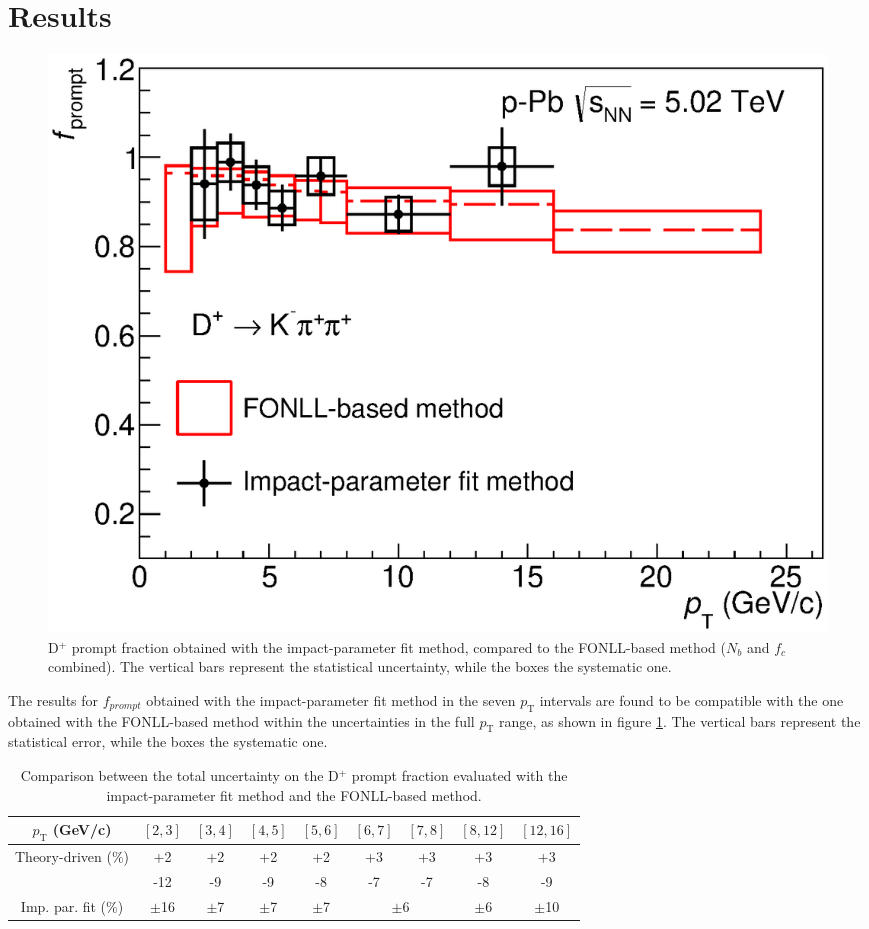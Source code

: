 \documentclass[b5paper,10pt,twoside,oldstyle,classica]{toptesi}
\newcommand{\pt}{p_\text{T}}
\begin{document}
\section{Results}
\begin{figure}[tb]
\begin{center}
\includegraphics[scale = 0.55]{prompt_fraction.eps}
\caption{D$^+$ prompt fraction obtained with the impact-parameter fit method, compared to the FONLL-based method ($N_b$ and $f_c$ combined). The vertical bars represent the statistical uncertainty, while the boxes the systematic one.}
\label{promptfrac}
\end{center}
\end{figure} 
The results for $f_{prompt}$ obtained with the impact-parameter fit method in the seven $\pt$ intervals are found to be compatible with the one obtained with the FONLL-based method within the uncertainties in the full $\pt$ range, as shown in figure \ref{promptfrac}. The vertical bars represent the statistical error, while the boxes the systematic one. 
\begin{table}[b]
\centering 
\begin{center} %
\renewcommand\arraystretch{1.5} 
\fontsize{10}{11}\selectfont
\begin{tabular}{|c|c|c|c|c|c|c|c|c|}
\hline
$\pt$ (GeV/c) & $[2,3]$ & $[3,4]$ & $[4,5]$ & $[5,6]$ & $[6,7]$ & $[7,8]$ & $[8,12]$ & $[12,16]$\\
\hline
\multirow{2}{*}{Theory-driven (\%)}& +2 & +2 & +2 & +2 & +3 & +3 & +3 & +3 \\
 & -12 & -9 & -9 & -8 & -7 & -7 & -8 & -9\\
\hline
Imp. par. fit (\%)& $\pm$16 & $\pm$7 & $\pm$7 & $\pm$7 & \multicolumn{2}{c|}{$\pm$6}& $\pm$6 & $\pm$10\\
\hline
\end{tabular} 
\caption{Comparison between the total uncertainty on the D$^+$ prompt fraction evaluated with the impact-parameter fit method and the FONLL-based method.}
\label{IP_err_comp}
\end{center} 
\end{table} 
\end{document}

